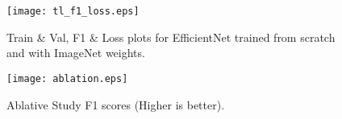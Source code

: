 \documentclass[10pt,twocolumn,letterpaper]{article}
\begin{document}
\begin{figure}[t]
  \centering
  \texttt{[image: tl\_f1\_loss.eps]}  
   \caption{Train \& Val, F1 \& Loss plots for EfficientNet trained from scratch and with ImageNet weights.}
   \vspace{-1em}
   \label{fig:tl_acc_loss}
\end{figure}


\begin{figure}[t]
  \centering
  \texttt{[image: ablation.eps]}  
   \caption{Ablative Study F1 scores (Higher is better).}
   \vspace{-1em}
   \label{fig:ablation}
\end{figure}

\clearpage
{\small


}
\end{document}
